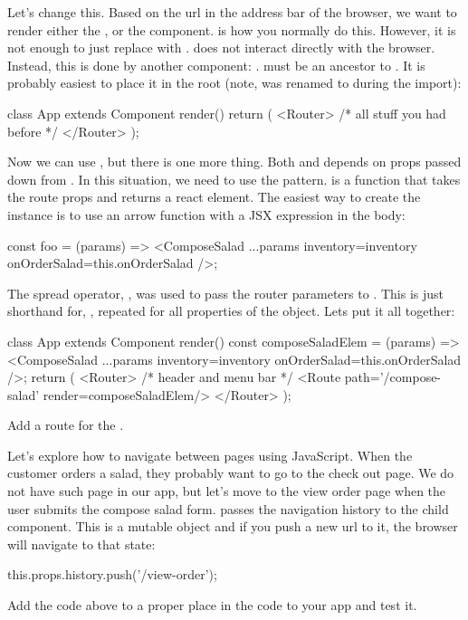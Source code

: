 \documentclass[fleqn, article, a4paper]{memoir}
\begin{document}
\begin{Assignments}
\item Let's change this. Based on the url in the address bar of the browser, we want to render either the , or the  component.  is how you normally do this. However, it is not enough to just replace  with .  does not interact directly with the browser. Instead, this is done by another component: .  must be an ancestor to . It is probably easiest to place it in the root (note,  was renamed to  during the import):
\begin{Code}
class App extends Component {
  render() {
    return (
      <Router>
        {/* all stuff you had before */}
      </Router>
    );
  }
}
\end{Code}
Now we can use , but there is one more thing. Both  and  depends on props passed down from . In this situation, we need to use the  pattern.  is a function that takes the route props and returns a react element. The easiest way to create the instance is to use an arrow function with a JSX expression in the body:
\begin{Code}
const foo = (params) => <ComposeSalad {...params} inventory={inventory} 
  onOrderSalad={this.onOrderSalad} />;
\end{Code}
The spread operator, , was used to pass the router parameters to . This is just shorthand for, , repeated for all properties of the  object. Lets put it all together:
\begin{Code}
class App extends Component {
  render() {
    const composeSaladElem = (params) => <ComposeSalad {...params} inventory={inventory} 
                       onOrderSalad={this.onOrderSalad} />;
    return (
      <Router>
        {/* header and menu bar */}
        <Route path='/compose-salad' render={composeSaladElem}/>
      </Router>
    );
  }
}
\end{Code}
Add a route for the .

\item Let's explore how to navigate between pages using JavaScript. When the customer orders a salad, they probably want to go to the check out page. We do not have such page in our app, but let's move to the view order page when the user submits the compose salad form.  passes the navigation history to the child component. This is a mutable object and if you push a new url to it, the browser will navigate to that state:
\begin{Code}
this.props.history.push('/view-order');
\end{Code}
Add the code above to a proper place in the code to your app and test it.


\end{Assignments}
\end{document}
